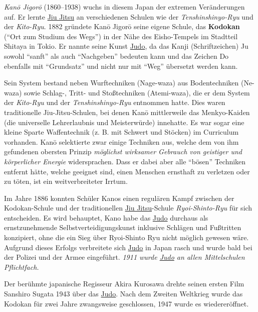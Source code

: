 \documentclass[justified, a4paper, notitlepage, captions=tableheading, nobib]{tufte-handout}
\begin{document}
\emph{Kanō Jigorō} (1860–1938) wuchs in diesem Japan der extremen Veränderungen auf. Er lernte \hyperref[org0aec6dd]{Jiu Jitsu} an verschiedenen Schulen wie der \emph{Tenshinshinyo-Ryu} und der \emph{Kito-Ryu}. 1882 gründete Kanō Jigorō seine eigene Schule, das \textbf{Kodokan} ("`Ort zum Studium des Wegs"') in der Nähe des Eisho-Tempels im Stadtteil Shitaya in Tokio. Er nannte seine Kunst \hyperref[org6f56467]{Judo}, da das Kanji (Schriftzeichen) Ju sowohl "`sanft"' als auch "`Nachgeben"' bedeuten kann und das Zeichen Do ebenfalls mit "`Grundsatz"' und nicht nur mit "`Weg"' übersetzt werden kann.

Sein System bestand neben Wurftechniken (Nage-waza) aus Bodentechniken (Ne-waza) sowie Schlag-, Tritt- und Stoßtechniken (Atemi-waza), die er dem System der \emph{Kito-Ryu} und der \emph{Tenshinshinyo-Ryu} entnommen hatte. Dies waren traditionelle Jiu-Jitsu-Schulen, bei denen Kanō mittlerweile das Menkyo-Kaiden (die universelle Lehrerlaubnis und Meisterwürde) innehatte. Es war sogar eine kleine Sparte Waffentechnik (z. B. mit Schwert und Stöcken) im Curriculum vorhanden. Kanō selektierte zwar einige Techniken aus, welche dem von ihm gefundenen obersten Prinzip \emph{möglichst wirksamer Gebrauch von geistiger und körperlicher Energie} widersprachen. Dass er dabei aber alle "`bösen"' Techniken entfernt hätte, welche geeignet sind, einen Menschen ernsthaft zu verletzen oder zu töten, ist ein weitverbreiteter Irrtum.

Im Jahre 1886 konnten Schüler Kanos einen regulären Kampf zwischen der Kodokan-Schule und der traditionellen \hyperref[org0aec6dd]{Jiu Jitsu}-Schule \emph{Ryoi-Shinto-Ryu} für sich entscheiden. Es wird behauptet, Kano habe das \hyperref[org6f56467]{Judo} durchaus als ernstzunehmende Selbstverteidigungskunst inklusive Schlägen und Fußtritten konzipiert, ohne die ein Sieg über Ryoi-Shinto Ryu nicht möglich gewesen wäre. Aufgrund dieses Erfolgs verbreitete sich \hyperref[org6f56467]{Judo} in Japan rasch und wurde bald bei der Polizei und der Armee eingeführt. \emph{1911 wurde \hyperref[org6f56467]{Judo} an allen Mittelschulen Pflichtfach.}

Der berühmte japanische Regisseur Akira Kurosawa drehte seinen ersten Film Sanshiro Sugata 1943 über das \hyperref[org6f56467]{Judo}.
Nach dem Zweiten Weltkrieg wurde das Kodokan für zwei Jahre zwangsweise geschlossen, 1947 wurde es wiedereröffnet.
\end{document}
